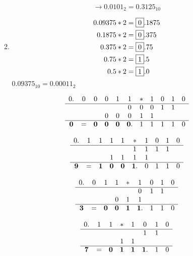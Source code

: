 \documentclass{article}
\begin{document}
\begin{enumerate}[a)]
\begin{enumerate}[1)]
    \[
      \rightarrow 0.0101_2 = 0.3125_{10}
    \]

  \newpage
  \item
    \begin{align*}
      0.09375 * 2 &= \framebox{0}.1875 \\
      0.1875  * 2 &= \framebox{0}.375 \\
      0.375   * 2 &= \framebox{0}.75 \\
      0.75    * 2 &= \framebox{1}.5 \\
      0.5     * 2 &= \framebox{1}.0 \\
    \end{align*}
    $0.09375_{10} = 0.00011_{2}$
    
    \[
      \begin{array}{cccc cccc ccc}
        0.&0&0&0&1&1&*&1&0&1&0 \\
        \cline{0-10}
          & & & & &0&0&0&1&1\\
          & & &0&0&0&1&1& \\
        \cline{0-10}
        \bm{0}&=&\bm{0}&\bm{0}&\bm{0}&\bm{0}.&1&1&1&1&0 \\
      \end{array}
    \]

    \[
      \begin{array}{cccc cccc cc}
        0.&1&1&1&1&*&1&0&1&0 \\
        \cline{0-9}
          & & & & &1&1&1&1\\
          & & &1&1&1&1& \\
        \cline{0-9}
        \bm{9}&=&\bm{1}&\bm{0}&\bm{0}&\bm{1}.&0&1&1&0 \\
      \end{array}
    \]

    \[
      \begin{array}{cccc cccc c}
        0.&0&1&1&*&1&0&1&0 \\
        \cline{0-8}
          & & & & &0&1&1 \\
          & & &0&1&1 \\
        \cline{0-8}
        \bm{3}&=&\bm{0}&\bm{0}&\bm{1}&\bm{1}.&1&1&0 \\
      \end{array}
    \]

    \[
      \begin{array}{cccc cccc}
        0.&1&1&*&1&0&1&0 \\
        \cline{0-7}
          & & & & &1&1 \\
          & & &1&1 \\
        \cline{0-7}
        \bm{7}&=&\bm{0}&\bm{1}&\bm{1}&\bm{1}.&1&0 \\
      \end{array}
    \]


\end{enumerate}
\end{enumerate}
\end{document}
